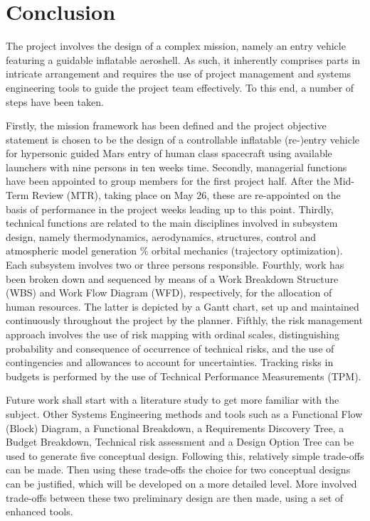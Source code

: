 \section{Conclusion}\label{cha:conclusion}
The project involves the design of a complex mission, namely an entry vehicle featuring a guidable inflatable aeroshell. As such, it inherently comprises parts in intricate arrangement and requires the use of project management and systems engineering tools to guide the project team effectively. To this end, a number of steps have been taken. 

Firstly, the mission framework has been defined and the project objective statement is chosen to be the design of a controllable inflatable (re-)entry vehicle for hypersonic guided Mars entry of human class spacecraft using available launchers with nine persons in ten weeks time.  Secondly, managerial functions have been appointed to group members for the first project half. After the Mid-Term Review (MTR), taking place on May 26, these are re-appointed on the basis of performance in the project weeks leading up to this point. Thirdly, technical functions are related to the main disciplines involved in subsystem design, namely thermodynamics, aerodynamics, structures, control and atmospheric model generation $\%$ orbital mechanics (trajectory optimization). Each subsystem involves two or three persons responsible. Fourthly, work has been broken down  and sequenced by means of a Work Breakdown Structure (WBS) and Work Flow Diagram (WFD), respectively, for the allocation of human resources. The latter is depicted by a Gantt chart, set up and maintained continuously throughout the project by the planner. Fifthly, the risk management approach involves the use of risk mapping with ordinal scales, distinguishing probability and consequence of occurrence of technical risks, and the use of contingencies and allowances to account for uncertainties. Tracking risks in budgets is performed by the use of Technical Performance Measurements (TPM).

Future work shall start with a literature study to get more familiar with the subject. Other Systems Engineering methods and tools such as a Functional Flow (Block) Diagram, a Functional Breakdown, a Requirements Discovery Tree, a Budget Breakdown, Technical risk assessment and a Design Option Tree can be used to generate five conceptual design. Following this, relatively simple trade-offs can be made. Then using these trade-offs the choice for two conceptual designs can be justified, which will be developed on a more detailed level. More involved trade-offs between these two preliminary design are then made, using a set of enhanced tools. 